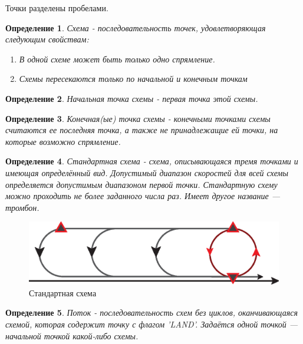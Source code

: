 \documentclass[12pt, a4 paper]{article}
\theoremstyle{plain}
\newtheorem{definition}{Определение}
\begin{document}
Точки разделены пробелами.

\begin{definition}{Схема - последовательность точек, удовлетворяющая следующим свойствам:
\begin{enumerate}
	\item В одной схеме может быть только одно спрямление.
	\item Схемы пересекаются только по начальной и конечным точкам
\end{enumerate}
}
\end{definition}

\begin{definition}{Начальная точка схемы - первая точка  этой схемы.}
\end{definition}

\begin{definition}{Конечная(ые) точка схемы - конечными точками схемы считаются ее последняя точка, а также не принадлежащие ей точки, на которые возможно спрямление.}
\end{definition}

\begin{definition}{Стандартная схема - схема, описывающаяся тремя точками и имеющая определённый вид. Допустимый диапазон скоростей для всей схемы определяется допустимым диапазоном первой точки. Стандартную схему можно проходить не более заданного числа раз. Имеет другое название --- тромбон.}
\end{definition}


\begin{figure}[h]
\includegraphics{StandardScheme.eps}
\caption{Стандартная схема}
\label{fig:StScheme}
\end{figure}


\begin{definition}{Поток - последовательность схем без циклов, оканчивающаяся схемой, которая содержит точку с флагом 'LAND'. Задаётся одной точкой --- начальной точкой какой-либо схемы.}
\end{definition}

\end{document}
